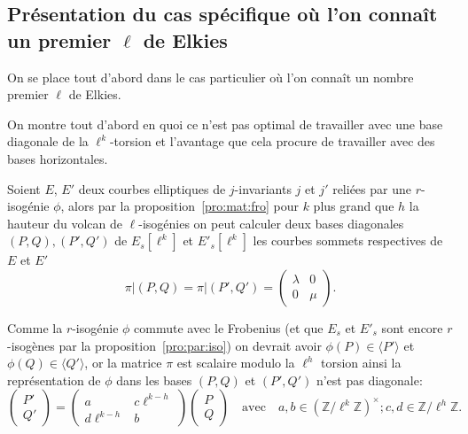 \documentclass[10pt,a4paper]{book}
\theoremstyle{plain}
\theoremstyle{definition}
\theoremstyle{definition}
\theoremstyle{definition}
\theoremstyle{definition}
\theoremstyle{remark}
\theoremstyle{remark}
\theoremstyle{definition}
\begin{document}
\subsection{Présentation du cas spécifique où l'on connaît un premier $\ell$ de Elkies}
\label{ssec:cou:elk}
On se place tout d'abord dans le cas particulier où l'on connaît un nombre 
premier $\ell$  de Elkies.

On montre tout d'abord en quoi ce n'est pas optimal de travailler avec une base
diagonale de la $\ell^k$-torsion et l'avantage que cela procure de travailler 
avec des bases horizontales.

Soient $E$, $E'$ deux courbes elliptiques de $j$-invariants $j$ et $j'$ reliées par une $r$-isogénie $\phi$, alors par la proposition~\ref{pro:mat:fro} pour $k$ plus grand que $h$ la hauteur du volcan de $\ell$-isogénies on peut calculer deux bases diagonales $(P,Q),(P',Q')$ de $E_s[\ell^k]$ et $E'_s[\ell^k]$ les courbes sommets respectives de $E$ et $E'$ 
\[
\pi|(P,Q)=\pi|(P',Q')= \left( \begin{matrix}
\lambda & 0 \\
0 & \mu
\end{matrix} \right).
\]

Comme la $r$-isogénie $\phi$ commute avec le Frobenius (et que $E_s$ et $E'_s$ sont encore $r$-isogènes par la proposition~\ref{pro:par:iso}) on devrait avoir $\phi(P) \in \langle P' \rangle $ et $\phi(Q) \in \langle Q' \rangle $, or la matrice $\pi$ est scalaire modulo la $\ell^{h}$ torsion ainsi la représentation de $\phi$ dans les bases $(P,Q)$ et $(P',Q')$ n'est pas diagonale:
\[
\left(
\begin{matrix}
P' \\
Q'
\end{matrix}
\right)=
\left( 
\begin{matrix}
a &  c\ell^{k-h} \\
d\ell^{k-h} & b
\end{matrix}
\right)
\left(
\begin{matrix}
P \\
Q
\end{matrix}
\right) \quad \text{avec} \quad a,b \in \left( \mathbb{Z}/\ell^k\mathbb{Z} \right)^{\times}; c,d \in \mathbb{Z}/\ell^{h}\mathbb{Z}.
\]
\end{document}
